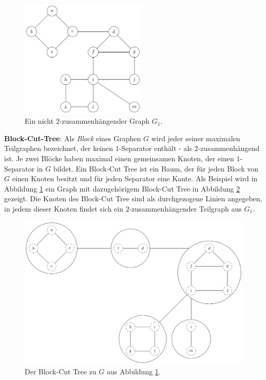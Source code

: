 \begin{figure}
  \includegraphics[width=6cm]{bilder/1-Block-Tree1.pdf}
  \caption{Ein nicht $2$-zusammenhängender Graph $G_1$.}
  \label{fig:1-Block-Tree1}
\end{figure}
\textbf{Block-Cut-Tree}: Als \textit{Block} eines Graphen $G$ wird jeder seiner maximalen Teilgraphen bezeichnet, der keinen $1$-Separator enthält - als $2$-zusammenhängend ist.
Je zwei Blöcke haben maximal einen gemeinsamen Knoten, der einen $1$-Separator in $G$ bildet.\cite{BoM08}
Ein Block-Cut Tree ist ein Baum, der für jeden Block von $G$ einen Knoten besitzt und für jeden Separator eine Kante.
Als Beispiel wird in Abbildung \ref{fig:1-Block-Tree1} ein Graph mit dazugehörigem Block-Cut Tree in Abbildung \ref{fig:1-Block-Tree2} gezeigt.
Die Knoten des Block-Cut Tree sind als durchgezogene Linien angegeben, in jedem dieser Knoten findet sich ein $2$-zusammenhängender Teilgraph aus $G_1$. %
\begin{figure}[H]
  \centering
  \includegraphics[width=\textwidth,height=\textheight,keepaspectratio]{bilder/1-Block-Tree2.pdf}
  \caption{Der Block-Cut Tree zu $G$ aus Abbildung \ref{fig:1-Block-Tree1}.}
  \label{fig:1-Block-Tree2}
\end{figure}

